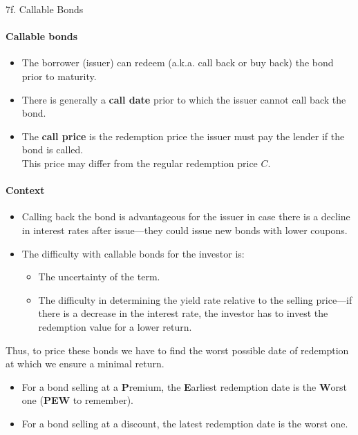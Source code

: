 \begin{CHPT_SUMM_AUTO}[label = {L.-7f}]{7f. Callable Bonds}
\paragraph*{Callable bonds}
\begin{itemize}[leftmargin = *]
	\item	The borrower (issuer) can redeem (a.k.a. call back or buy back) the bond prior to maturity.
	\item	There is generally a \textbf{call date} prior to which the issuer cannot call back the bond.
	\item	The \textbf{call price} is the redemption price the issuer must pay the lender if the bond is called.\\
			This price may differ from the regular redemption price $C$.
\end{itemize}

\paragraph*{Context}
\begin{itemize}[leftmargin = *]
	\item	Calling back the bond is advantageous for the issuer in case there is a decline in interest rates after issue---they could issue new bonds with lower coupons.
	\item	The difficulty with callable bonds for the investor is:
			\begin{itemize}[leftmargin = *]
			\item	The uncertainty of the term.
			\item	The difficulty in determining the yield rate relative to the selling price---if there is a decrease in the interest rate, the investor has to invest the redemption value for a lower return.
			\end{itemize}
\end{itemize}

\tcbline

Thus, to price these bonds we have to find the worst possible date of redemption at which we ensure a minimal return.
\begin{itemize}
	\item	For a bond selling at a \textbf{P}remium, the \textbf{E}arliest redemption date is the \textbf{W}orst one (\textbf{PEW} to remember).
	\item	For a bond selling at a discount, the latest redemption date is the worst one.
\end{itemize}
\end{CHPT_SUMM_AUTO}

